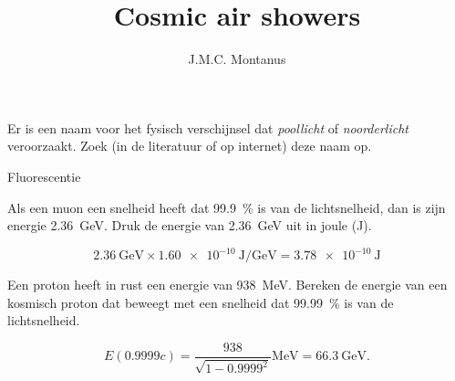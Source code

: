 

\title{Cosmic air showers}
\author{J.M.C. Montanus}



\maketitle

\begin{questions}


\question Er is een naam voor het fysisch verschijnsel dat \emph{poollicht} of
\emph{noorderlicht} veroorzaakt. Zoek (in de literatuur of op internet)
deze naam op.
\begin{solution}
Fluorescentie
\end{solution}



\question Als een muon een snelheid heeft dat \SI{99.9}{\percent} is van de lichtsnelheid, dan
is zijn energie \SI{2.36}{\giga\electronvolt}. Druk de energie van
\SI{2.36}{\giga\electronvolt} uit in joule (\si{\joule}).
\begin{solution}
\begin{equation}
    \SI{2.36}{\giga\electronvolt} \times
    \SI{1.60e-10}{\joule\per\giga\electronvolt} = \SI{3.78e-10}{\joule}
    \nonumber
\end{equation}
\end{solution}

\question Een proton heeft in rust een energie van \SI{938}{\mega\electronvolt}.
Bereken de energie van een kosmisch proton dat beweegt met een snelheid
dat \SI{99.99}{\percent} is van de lichtsnelheid.
\begin{solution}
\begin{equation}
    E(\num{0.9999}c) = \frac{938}{\sqrt{1-\num{0.9999}^2}}\si{\mega\electronvolt}
    = \SI{66.3}{\giga\electronvolt}. \nonumber
\end{equation}
\end{solution}


\end{questions}
